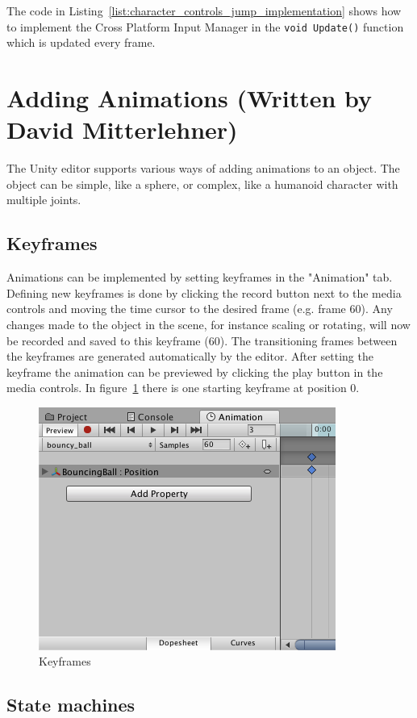 \documentclass[conference]{IEEEtran}
\begin{document}
The code in Listing~\ref{list:character_controls_jump_implementation} shows how to implement the Cross Platform Input Manager in the \lstinline!void Update()! function which is updated every frame. 

\section{Adding Animations (Written by David Mitterlehner)}

The Unity editor supports various ways of adding animations to an object. The object can be simple, like a sphere, or complex, like a humanoid character with multiple joints. 

\subsection{Keyframes}

Animations can be implemented by setting keyframes in the "Animation" tab. Defining new keyframes is done by clicking the record button next to the media controls and moving the time cursor to the desired frame (e.g. frame 60). Any changes made to the object in the scene, for instance scaling or rotating, will now be recorded and saved to this keyframe (60). The transitioning frames between the keyframes are generated automatically by the editor. After setting the keyframe the animation can be previewed by clicking the play button in the media controls. In figure~\ref{fig:adding_animations_keyframes} there is one starting keyframe at position 0.
\begin{figure}[htbp]
  \includegraphics[width=.4\textwidth]{pictures/keyframes}
  \caption{Keyframes}
  \label{fig:adding_animations_keyframes}
\end{figure}

\subsection{State machines}
\end{document}
